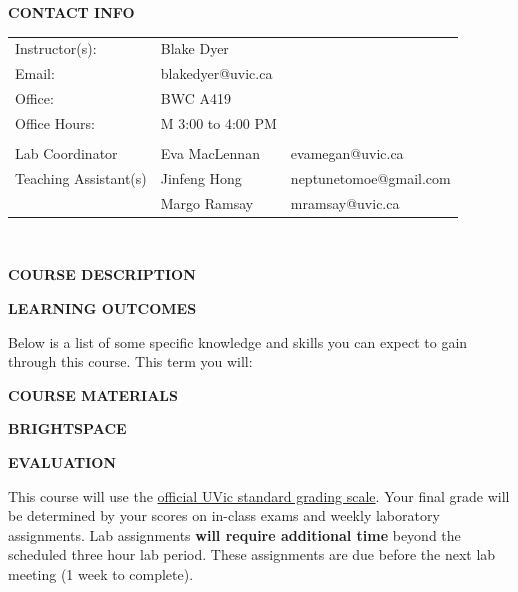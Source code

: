 \documentclass[11pt]{article}
\begin{document}
\textbf{CONTACT INFO}

\begin{center}
  \centering
  \begin{tabular}{ L{.25\linewidth}L{.25\linewidth}L{.25\linewidth} }
    Instructor(s):      & Blake Dyer &  \\
    Email:      & blakedyer@uvic.ca &  \\
    Office:      & BWC A419 &  \\
    Office Hours:      & M 3:00 to 4:00 PM &  \\
          &  &  \\
    Lab Coordinator      & Eva MacLennan &  evamegan@uvic.ca\\
Teaching Assistant(s)      & Jinfeng Hong & neptunetomoe@gmail.com \\
      & Margo Ramsay & mramsay@uvic.ca \\
  \end{tabular}\\
\end{center}

\begin{center}
\textbf{COURSE DESCRIPTION}
\end{center}



\clearpage

\textbf{LEARNING OUTCOMES}

Below is a list of some specific knowledge and skills you can expect to gain through this course. This term you will:
\begin{itemize}
	\setlength\itemsep{0em}
        {\item \learningoutcome}
\end{itemize}

\textbf{COURSE MATERIALS}



\textbf{BRIGHTSPACE}



\begin{center}
  \textbf{EVALUATION}
\end{center}

This course will use the \href{https://www.uvic.ca/calendar/future/undergrad/index.php#/policy/S1AAgoGuV?bc=true&bcCurrent=14%20-%20Grading&bcGroup=Undergraduate%20Academic%20Regulations&bcItemType=policies}{official UVic standard grading scale}. Your final grade will be determined by your scores on in-class exams and weekly laboratory assignments. Lab assignments \textbf{will require additional time} beyond the scheduled three hour lab period. These assignments are due before the next lab meeting (1 week to complete).
\end{document}
